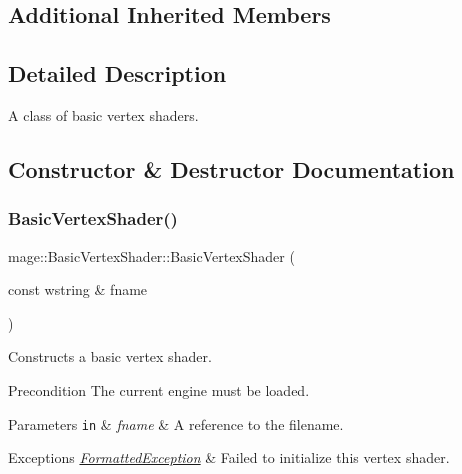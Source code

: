 \subsection*{Additional Inherited Members}


\subsection{Detailed Description}
A class of basic vertex shaders. 

\subsection{Constructor \& Destructor Documentation}
\hypertarget{classmage_1_1_basic_vertex_shader_ab00129cc3b679e531480153ece6a2456}{}\label{classmage_1_1_basic_vertex_shader_ab00129cc3b679e531480153ece6a2456} 
\subsubsection{\texorpdfstring{Basic\+Vertex\+Shader()}{BasicVertexShader()}\hspace{0.1cm}{\footnotesize\ttfamily [1/6]}}
{\footnotesize\ttfamily mage\+::\+Basic\+Vertex\+Shader\+::\+Basic\+Vertex\+Shader (\begin{DoxyParamCaption}\item[{const wstring \&}]{fname }\end{DoxyParamCaption})\hspace{0.3cm}{\ttfamily [explicit]}}

Constructs a basic vertex shader.

\begin{DoxyPrecond}{Precondition}
The current engine must be loaded. 
\end{DoxyPrecond}

\begin{DoxyParams}[1]{Parameters}
\mbox{\tt in}  & {\em fname} & A reference to the filename. \\
\hline
\end{DoxyParams}

\begin{DoxyExceptions}{Exceptions}
{\em \hyperlink{structmage_1_1_formatted_exception}{Formatted\+Exception}} & Failed to initialize this vertex shader. \\
\hline
\end{DoxyExceptions}
\hypertarget{classmage_1_1_basic_vertex_shader_a906db88dc79cfc9c3f0898d14f54065d}{}\label{classmage_1_1_basic_vertex_shader_a906db88dc79cfc9c3f0898d14f54065d} 
